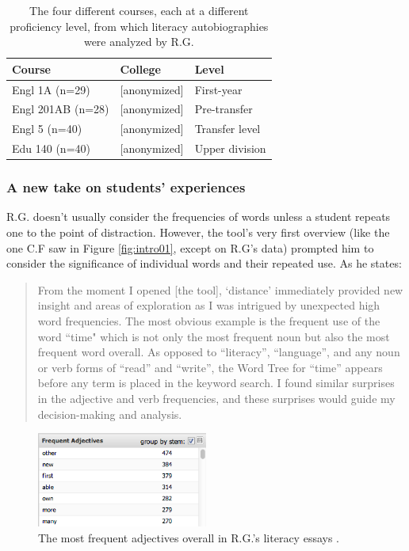 \documentclass{sig-alternate}
\begin{document}
\begin{table}
\begin{tabular}{lll}
Course& College & Level \\
\hline
Engl 1A (n=29) & [anonymized] & First-year \\
Engl 201AB (n=28) & [anonymized] & Pre-transfer \\
Engl 5 (n=40) & [anonymized] & Transfer level \\
Edu 140 (n=40) & [anonymized] & Upper division \\
\end{tabular}
\caption{The four different courses, each at a different proficiency level, from which literacy autobiographies were analyzed by R.G. \label{table:rex-courses}}
\end{table}


 \subsubsection{A new take on students' experiences}

R.G. doesn't usually consider the frequencies of words unless a student repeats one to the point of distraction. However, the tool's very first overview (like the one C.F saw in Figure \ref{fig:intro01}, except on R.G's data) prompted him to consider the significance of individual words and their repeated use.  As he states:
\begin{quote}
From the moment I opened [the tool], `distance' immediately provided new insight and areas of exploration as I was intrigued by unexpected high word frequencies.  The most obvious example is the frequent use of the word ``time" which is not only the most frequent noun but also the most frequent word overall.  As opposed to ``literacy'', ``language'', and any noun or verb forms of ``read'' and ``write'', the Word Tree for ``time'' appears before any term is placed in the keyword search.   I found similar surprises in the adjective and verb frequencies, and these surprises would guide my decision-making and analysis.
\end{quote}

\begin{figure}
\includegraphics[width=0.5\textwidth]{fig/rex/02.png}
\caption{The most frequent adjectives overall in R.G.'s literacy essays \label{fig:rex02}.}
\end{figure}
\end{document}
